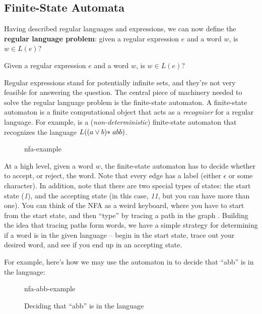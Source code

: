 \subsection{Finite-State Automata}
Having described regular languages and expressions, we can now define the \textbf{regular language problem}: given a regular expression $e$ and a word $w$, is $w \in L(e)$?

\begin{definition}
    Given a regular expression $e$ and a word $w$, is $w \in L(e)$?
\end{definition}

Regular expressions stand for potentially infinite sets, and they're not very feasible for answering the question. The central piece of machinery needed to solve the regular language problem is the finite-state automaton. A finite-state automaton is a finite computational object that acts as a \emph{recognizer} for a regular language. For example,  is a (\emph{non-deterministic}) finite-state automaton that recognizes the language $L((a \lor b)\* abb)$. 

\begin{figure}[H]
    \centering
    {nfa-example}
    \label{fig:nfa-example}
\end{figure}

At a high level, given a word $w$, the finite-state automaton has to decide whether to accept, or reject, the word. Note that every edge has a label (either $\epsilon$ or some character). In addition, note that there are two special types of states: the start state (\textit{1}), and the accepting state (in this case, \textit{11}, but you can have more than one). You can think of the NFA as a weird keyboard, where you have to start from the start state, and then ``type'' by tracing a path in the graph . Building the idea that tracing paths form words, we have a simple strategy for determining if a word is in the given language -- begin in the start state, trace out your desired word, and see if you end up in an accepting state. 

For example, here's how we may use the automaton in  to decide that ``abb'' is in the language:\par

\begin{figure}[H]
    \begin{center}
    {nfa-abb-example}
    \end{center}
    \caption{Deciding that ``abb'' is in the language}
    \label{fig:nfa-decision}
\end{figure}

